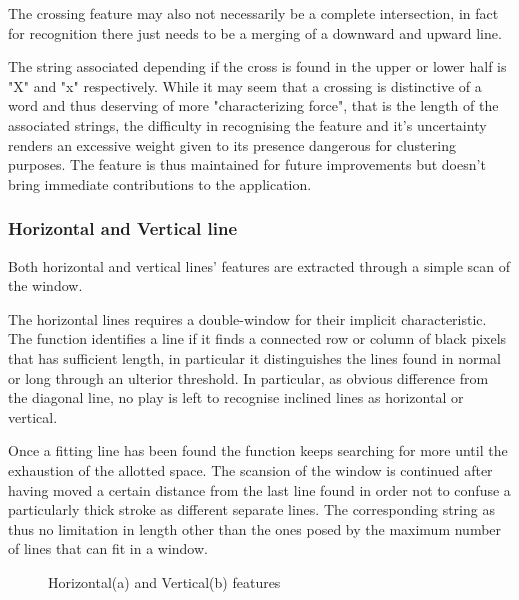 The crossing feature may also not necessarily be a complete intersection, in fact for recognition there just needs to be a merging of a downward and upward line. 

The string associated depending if the cross is found in the upper or lower half is "X" and "x" respectively.
While it may seem that a crossing is distinctive of a word and thus deserving of more "characterizing force", that is the length of the associated strings, the difficulty in recognising the feature and it's uncertainty renders an excessive weight given to its presence dangerous for clustering purposes.
The feature is thus maintained for future improvements but doesn't bring immediate 
contributions to the application.

\subsubsection{Horizontal and Vertical line}
Both horizontal and vertical lines' features are extracted through
a simple scan of the window.

The horizontal lines requires a double-window for their implicit characteristic.
The function identifies a line if it finds a connected row or column of black pixels that has sufficient length, in particular it distinguishes the lines found in normal or long through an ulterior threshold.
In particular, as obvious difference from the diagonal line, no play is left to recognise inclined lines as horizontal or vertical.

Once a fitting line has been found the function keeps searching for more until the exhaustion of the allotted space. The scansion of the window is continued after having moved a certain distance from the last line found in order not to confuse a particularly thick stroke as different separate lines.
The corresponding string as thus no limitation in length other than the ones posed by the maximum number of lines that can fit in a window.

\begin{figure}[!htpb]
 \centering
 \hspace{15mm}
 \caption{Horizontal(a) and Vertical(b) features}
  \end{figure}
\vspace{2mm}

